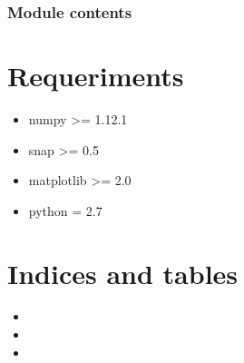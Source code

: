 \documentclass[letterpaper,10pt,english]{sphinxmanual}
\begin{document}
\begin{fulllineitems}
\label{\detokenize{utils:utils.utils.linealRegresssion}}
\end{fulllineitems}


\begin{fulllineitems}
\label{\detokenize{utils:utils.utils.removeNodes}}
\end{fulllineitems}



\subsection{Module contents}
\label{\detokenize{utils:module-utils}}\label{\detokenize{utils:module-contents}}

\chapter{Requeriments}
\label{\detokenize{index:requeriments}}\begin{itemize}
\item {} 
numpy \textgreater{}= 1.12.1

\item {} 
snap \textgreater{}= 0.5

\item {} 
matplotlib \textgreater{}= 2.0

\item {} 
python = 2.7

\end{itemize}


\chapter{Indices and tables}
\label{\detokenize{index:indices-and-tables}}\begin{itemize}
\item {} 

\item {} 

\item {} 

\end{itemize}
\end{document}
